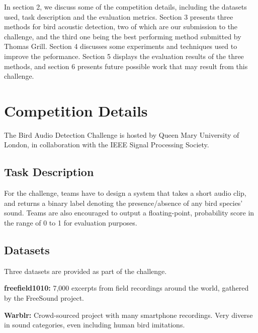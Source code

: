 \documentclass[10pt,twocolumn,letterpaper]{article}
\begin{document}
In section 2, we discuss some of the competition details, including the
datasets used, task description and the evaluation metrics. Section 3
presents three methods for bird acoustic detection, two of which are our
submission to the challenge, and the third one being the best performing
method submitted by Thomas Grill. Section 4 discusses some experiments and
techniques used to improve the peformance. Section 5 displays the
evaluation results of the three methods, and section 6 presents future
possible work that may result from this challenge.

\section{Competition Details}

The Bird Audio Detection Challenge is hosted by Queen Mary University of
London, in collaboration with the IEEE Signal Processing Society.

\subsection{Task Description}

For the challenge, teams have to design a system that takes a short audio
clip, and returns a binary label denoting the presence/absence of any bird
species' sound. Teams are also encouraged to output a floating-point,
probability score in the range of 0 to 1 for evaluation purposes.

\subsection{Datasets}

Three datasets are provided as part of the challenge.


\textbf{freefield1010:} 7,000 excerpts from field recordings around the
world, gathered by the FreeSound project.

\textbf{Warblr:} Crowd-sourced project with many smartphone recordings.
Very diverse in sound categories, even including human bird imitations.

\end{document}
